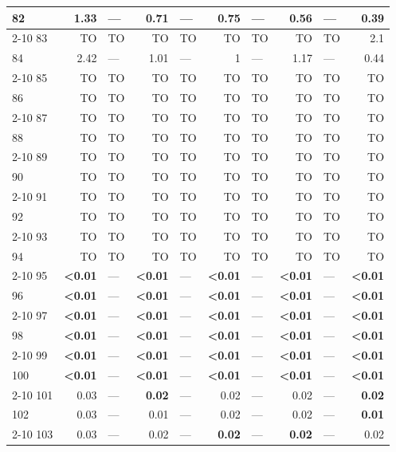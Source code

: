 \begin{longtable}{lr@{\hskip 4pt}l@{\hskip 12pt}r@{\hskip 4pt}l@{\hskip 12pt}r@{\hskip 4pt}l@{\hskip 12pt}r@{\hskip 4pt}l@{\hskip 12pt}r}
82 & 1.33 & --- & 0.71 & --- & 0.75 & --- & 0.56 & --- & 0.39 \\
\cmidrule{2-10}
83 & TO & TO & TO & TO & TO & TO & TO & TO & 2.1 \\
84 & 2.42 & --- & 1.01 & --- & 1 & --- & 1.17 & --- & 0.44 \\
\cmidrule{2-10}
85 & TO & TO & TO & TO & TO & TO & TO & TO & TO \\
86 & TO & TO & TO & TO & TO & TO & TO & TO & TO \\
\cmidrule{2-10}
87 & TO & TO & TO & TO & TO & TO & TO & TO & TO \\
88 & TO & TO & TO & TO & TO & TO & TO & TO & TO \\
\cmidrule{2-10}
89 & TO & TO & TO & TO & TO & TO & TO & TO & TO \\
90 & TO & TO & TO & TO & TO & TO & TO & TO & TO \\
\cmidrule{2-10}
91 & TO & TO & TO & TO & TO & TO & TO & TO & TO \\
92 & TO & TO & TO & TO & TO & TO & TO & TO & TO \\
\cmidrule{2-10}
93 & TO & TO & TO & TO & TO & TO & TO & TO & TO \\
94 & TO & TO & TO & TO & TO & TO & TO & TO & TO \\
\cmidrule{2-10}
95 & \textbf{<0.01} & --- & \textbf{<0.01} & --- & \textbf{<0.01} & --- & \textbf{<0.01} & --- & \textbf{<0.01} \\
96 & \textbf{<0.01} & --- & \textbf{<0.01} & --- & \textbf{<0.01} & --- & \textbf{<0.01} & --- & \textbf{<0.01} \\
\cmidrule{2-10}
97 & \textbf{<0.01} & --- & \textbf{<0.01} & --- & \textbf{<0.01} & --- & \textbf{<0.01} & --- & \textbf{<0.01} \\
98 & \textbf{<0.01} & --- & \textbf{<0.01} & --- & \textbf{<0.01} & --- & \textbf{<0.01} & --- & \textbf{<0.01} \\
\cmidrule{2-10}
99 & \textbf{<0.01} & --- & \textbf{<0.01} & --- & \textbf{<0.01} & --- & \textbf{<0.01} & --- & \textbf{<0.01} \\
100 & \textbf{<0.01} & --- & \textbf{<0.01} & --- & \textbf{<0.01} & --- & \textbf{<0.01} & --- & \textbf{<0.01} \\
\cmidrule{2-10}
101 & 0.03 & --- & \textbf{0.02} & --- & 0.02 & --- & 0.02 & --- & \textbf{0.02} \\
102 & 0.03 & --- & 0.01 & --- & 0.02 & --- & 0.02 & --- & \textbf{0.01} \\
\cmidrule{2-10}
103 & 0.03 & --- & 0.02 & --- & \textbf{0.02} & --- & \textbf{0.02} & --- & 0.02 \\

\end{longtable}
